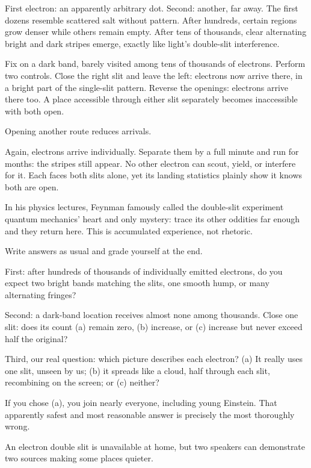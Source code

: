 First electron: an apparently arbitrary dot. Second: another, far away. The first dozens resemble scattered salt without pattern. After hundreds, certain regions grow denser while others remain empty. After tens of thousands, clear alternating bright and dark stripes emerge, exactly like light's double-slit interference.

Fix on a dark band, barely visited among tens of thousands of electrons. Perform two controls. Close the right slit and leave the left: electrons now arrive there, in a bright part of the single-slit pattern. Reverse the openings: electrons arrive there too. A place accessible through either slit separately becomes inaccessible with both open.

Opening another route reduces arrivals.

Again, electrons arrive individually. Separate them by a full minute and run for months: the stripes still appear. No other electron can scout, yield, or interfere for it. Each faces both slits alone, yet its landing statistics plainly show it knows both are open.

In his physics lectures, Feynman famously called the double-slit experiment quantum mechanics' heart and only mystery: trace its other oddities far enough and they return here. This is accumulated experience, not rhetoric.


Write answers as usual and grade yourself at the end.

First: after hundreds of thousands of individually emitted electrons, do you expect two bright bands matching the slits, one smooth hump, or many alternating fringes?

Second: a dark-band location receives almost none among thousands. Close one slit: does its count (a) remain zero, (b) increase, or (c) increase but never exceed half the original?

Third, our real question: which picture describes each electron? (a) It really uses one slit, unseen by us; (b) it spreads like a cloud, half through each slit, recombining on the screen; or (c) neither?

If you chose (a), you join nearly everyone, including young Einstein. That apparently safest and most reasonable answer is precisely the most thoroughly wrong.


An electron double slit is unavailable at home, but two speakers can demonstrate two sources making some places quieter.

